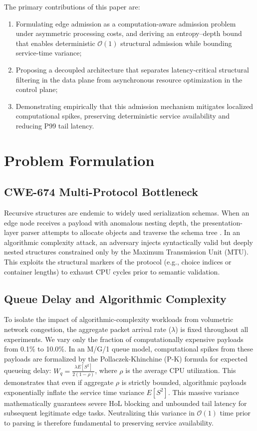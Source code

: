 \documentclass[conference]{IEEEtran}
\begin{document}
The primary contributions of this paper are:
\begin{enumerate}
    \item Formulating edge admission as a computation-aware admission problem under asymmetric processing costs, and deriving an entropy--depth bound that enables deterministic $\mathcal{O}(1)$ structural admission while bounding service-time variance;
    \item Proposing a decoupled architecture that separates latency-critical structural filtering in the data plane from asynchronous resource optimization in the control plane;
    \item Demonstrating empirically that this admission mechanism mitigates localized computational spikes, preserving deterministic service availability and reducing P99 tail latency.
\end{enumerate}

\section{Problem Formulation}

\subsection{CWE-674 Multi-Protocol Bottleneck}
Recursive structures are endemic to widely used serialization schemas. When an edge node receives a payload with anomalous nesting depth, the presentation-layer parser attempts to allocate objects and traverse the schema tree \cite{Wang2024}. In an algorithmic complexity attack, an adversary injects syntactically valid but deeply nested structures constrained only by the Maximum Transmission Unit (MTU). This exploits the structural markers of the protocol (e.g., choice indices or container lengths) to exhaust CPU cycles prior to semantic validation.

\subsection{Queue Delay and Algorithmic Complexity}
To isolate the impact of algorithmic-complexity workloads from volumetric network congestion, the aggregate packet arrival rate ($\lambda$) is fixed throughout all experiments. We vary only the fraction of computationally expensive payloads from 0.1\% to 10.0\%. In an M/G/1 queue model, computational spikes from these payloads are formalized by the Pollaczek-Khinchine (P-K) formula for expected queueing delay: $W_q = \frac{\lambda E[S^2]}{2(1-\rho)}$, where $\rho$ is the average CPU utilization. This demonstrates that even if aggregate $\rho$ is strictly bounded, algorithmic payloads exponentially inflate the service time variance $E[S^2]$. This massive variance mathematically guarantees severe HoL blocking and unbounded tail latency for subsequent legitimate edge tasks. Neutralizing this variance in $\mathcal{O}(1)$ time prior to parsing is therefore fundamental to preserving service availability.
\end{document}
